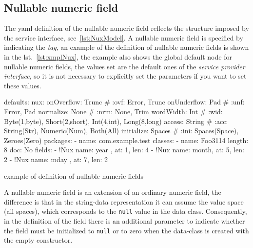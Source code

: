 \documentclass[a4paper,10pt]{report}
\newenvironment{elisting}[1][H]
  {\captionsetup{aboveskip=0pt}\begin{listing}[#1]}
  {\end{listing}%
}
\begin{document}
\subsection{Nullable numeric field} \label{sub:yaml.nux}
The yaml definition of the nullable numeric field reflects the structure imposed 
by the service interface, see~\ref{lst:NuxModel}. 
A nullable numeric field is specified by indicating the 
 \textsl{tag}, an example of the 
definition of nullable numeric fields is shown in the lst.~\ref{lst:xmplNux}, 
the example also shows the global default node for nullable numeric fields, the 
values set are the default ones of the \textsl{service provider interface}, so 
it is not necessary to explicitly set the parameters if you want to set these 
values.

\begin{elisting}[!htb]
\begin{yamlcode}
defaults:
  nux:
    onOverflow: Trunc   # :ovf: Error, Trunc
    onUnderflow: Pad    # :unf: Error, Pad
    normalize: None     # :nrm: None, Trim
    wordWidth: Int      # :wid: Byte(1,byte), Short(2,short), Int(4,int), Long(8,long)
    access: String      # :acc: String(Str), Numeric(Num), Both(All)
    initialize: Spaces  # :ini: Spaces(Space), Zeroes(Zero)
packages:
  - name: com.example.test
    classes:
      - name: Foo3114
        length: 8
        doc: No
        fields:
          - !Nux { name: year , at: 1, len: 4 }
          - !Nux { name: month, at: 5, len: 2 }
          - !Nux { name: mday , at: 7, len: 2 }
\end{yamlcode}
\caption{example of definition of nullable numeric fields}
\label{lst:xmplNux}
\end{elisting}

A nullable numeric field is an extension of an ordinary numeric field, the 
difference is that in the string-data representation it can assume the value 
space (all spaces), which corresponds to the \texttt{null} value in the data 
class. 
Consequently, in the definition of the field there is an additional parameter to
indicate whether the field must be initialized to \texttt{null} or to zero when 
the data-class is created with the empty constructor.
\end{document}
